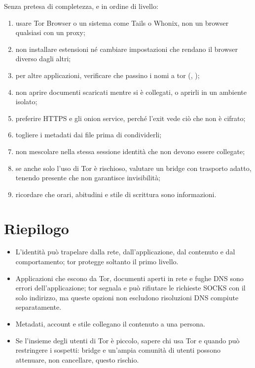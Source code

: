Senza pretesa di completezza, e in ordine di livello:
\begin{enumerate}
  \item usare Tor Browser o un sistema come Tails o Whonix, non un browser qualsiasi con un proxy;
  \item non installare estensioni né cambiare impostazioni che rendano il browser diverso dagli altri;
  \item per altre applicazioni, verificare che passino i nomi a tor (, );
  \item non aprire documenti scaricati mentre si è collegati, o aprirli in un ambiente isolato;
  \item preferire HTTPS e gli onion service, perché l'exit vede ciò che non è cifrato;
  \item togliere i metadati dai file prima di condividerli;
  \item non mescolare nella stessa sessione identità che non devono essere collegate;
  \item se anche solo l'uso di Tor è rischioso, valutare un bridge con trasporto adatto, tenendo presente che non garantisce invisibilità;
  \item ricordare che orari, abitudini e stile di scrittura sono informazioni.
\end{enumerate}

\section*{Riepilogo}
\begin{itemize}
  \item L'identità può trapelare dalla rete, dall'applicazione, dal contenuto e dal comportamento; tor protegge soltanto il primo livello.
  \item Applicazioni che escono da Tor, documenti aperti in rete e fughe DNS sono errori dell'applicazione; tor segnala e può rifiutare le richieste SOCKS con il solo indirizzo, ma queste opzioni non escludono risoluzioni DNS compiute separatamente.
  \item Metadati, account e stile collegano il contenuto a una persona.
  \item Se l'insieme degli utenti di Tor è piccolo, sapere chi usa Tor e quando può restringere i sospetti: bridge e un'ampia comunità di utenti possono attenuare, non cancellare, questo rischio.
\end{itemize}

